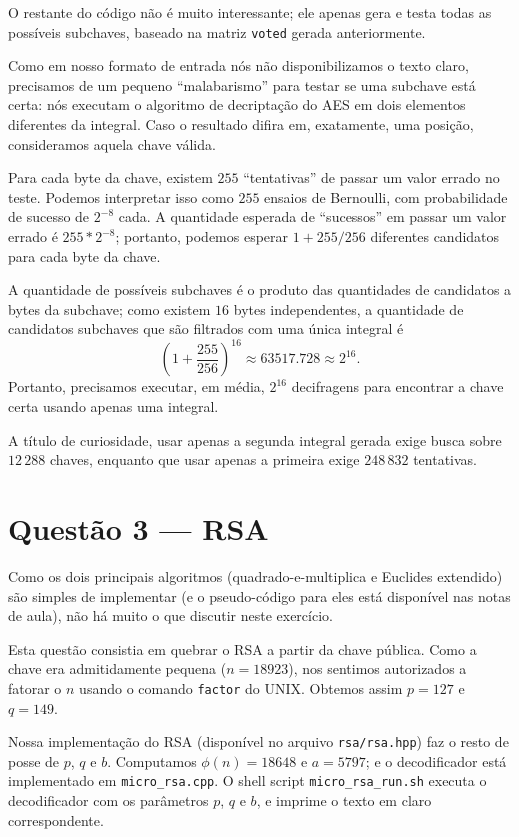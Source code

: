 \documentclass{article}
\begin{document}
O restante do código não é muito interessante;
ele apenas gera e testa todas as possíveis subchaves,
baseado na matriz \verb"voted" gerada anteriormente.

Como em nosso formato de entrada nós não disponibilizamos o texto claro,
precisamos de um pequeno ``malabarismo'' para testar se uma subchave está certa:
nós executam o algoritmo de decriptação do AES
em dois elementos diferentes da integral.
Caso o resultado difira em, exatamente, uma posição,
consideramos aquela chave válida.

Para cada byte da chave,
existem $255$ ``tentativas'' de passar um valor errado no teste.
Podemos interpretar isso como $255$ ensaios de Bernoulli,
com probabilidade de sucesso de $2^{-8}$ cada.
A quantidade esperada de ``sucessos'' em passar um valor errado
é $255*2^{-8}$;
portanto, podemos esperar $1 + 255/256$
diferentes candidatos para cada byte da chave.

A quantidade de possíveis subchaves
é o produto das quantidades de candidatos a bytes da subchave;
como existem $16$ bytes independentes,
a quantidade de candidatos subchaves que são filtrados com uma única integral é
\begin{equation*}
    \left(1 + \frac{255}{256}\right) ^{16} \approx 63517.728 \approx 2^{16}.
\end{equation*}
Portanto, precisamos executar,
em média, $2^{16}$ decifragens para encontrar a chave certa
usando apenas uma integral.

A título de curiosidade, usar apenas a segunda integral gerada
exige busca sobre $12\,288$ chaves,
enquanto que usar apenas a primeira exige $248\,832$ tentativas.


\section{Questão 3 --- RSA}

Como os dois principais algoritmos
(quadrado-e-multiplica e Euclides extendido)
são simples de implementar
(e o pseudo-código para eles está disponível nas notas de aula),
não há muito o que discutir neste exercício.

Esta questão consistia em quebrar o RSA
a partir da chave pública.
Como a chave era admitidamente pequena ($n = 18923$),
nos sentimos autorizados a fatorar o $n$ usando o comando \verb"factor" do UNIX.
Obtemos assim $p = 127$ e $q = 149$.

Nossa implementação do RSA (disponível no arquivo \verb"rsa/rsa.hpp")
faz o resto de posse de $p$, $q$ e $b$.
Computamos $\phi(n) = 18648$ e $a = 5797$;
e o decodificador está implementado em \verb"micro_rsa.cpp".
O shell script \verb"micro_rsa_run.sh"
executa o decodificador com os parâmetros $p$, $q$ e $b$,
e imprime o texto em claro correspondente.
\end{document}
